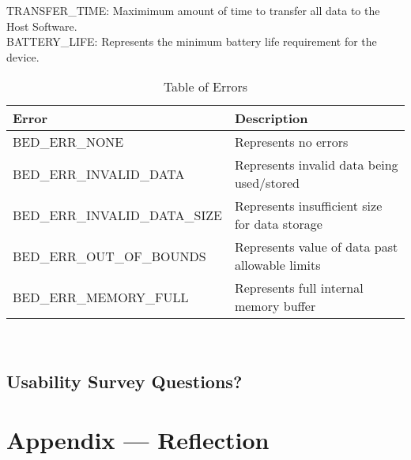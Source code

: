 \documentclass[12pt, titlepage]{article}
\begin{document}
TRANSFER\_TIME: Maximimum amount of time to transfer all data to the Host Software.\\
BATTERY\_LIFE: Represents the minimum battery life requirement for the device.\\


\begin{flushleft} 
	\begin{table}[H]
		\begin{tabular}{l l} 
			  \toprule		
				  \textbf{Error} & \textbf{Description}\\
				  \midrule 
				  BED\_ERR\_NONE 					& Represents no errors\\
				  BED\_ERR\_INVALID\_DATA			& Represents invalid data being used/stored\\
				  BED\_ERR\_INVALID\_DATA\_SIZE 		& Represents insufficient size for data storage\\
				  BED\_ERR\_OUT\_OF\_BOUNDS 		& Represents value of data past allowable limits\\
				  BED\_ERR\_MEMORY\_FULL 			& Represents full internal memory buffer\\
		
			  \bottomrule
		\end{tabular}\\
		\caption{\label{Err}Table of Errors}

	\end{table}
\end{flushleft} 
\subsection{Usability Survey Questions?}



\newpage{}
\section*{Appendix --- Reflection}
\end{document}
